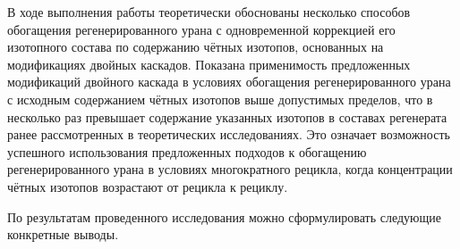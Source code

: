 В ходе выполнения работы теоретически обоснованы несколько способов обогащения регенерированного урана с одновременной коррекцией его изотопного состава по содержанию чётных изотопов, основанных на модификациях двойных каскадов. Показана применимость предложенных модификаций двойного каскада в условиях обогащения регенерированного урана с исходным содержанием чётных изотопов выше допустимых пределов, что в несколько раз превышает содержание указанных изотопов в составах регенерата ранее рассмотренных в теоретических исследованиях. Это означает возможность успешного использования предложенных подходов к обогащению регенерированного урана в условиях многократного рецикла, когда концентрации чётных изотопов возрастают от рецикла к рециклу.

По результатам проведенного исследования можно сформулировать следующие конкретные выводы.

